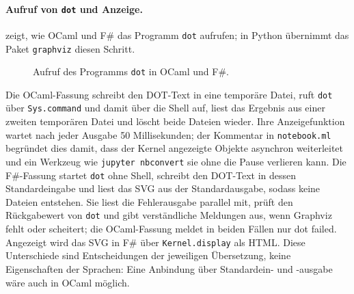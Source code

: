 \paragraph{Aufruf von \texttt{dot} und Anzeige.}
 zeigt, wie OCaml und F\# das Programm \texttt{dot} aufrufen; in Python übernimmt das Paket \texttt{graphviz} diesen Schritt.

\begin{figure}[htbp]


\caption{Aufruf des Programms \texttt{dot} in OCaml und F\#.}
\label{fig:render_dot}
\end{figure}

Die OCaml-Fassung schreibt den DOT-Text in eine temporäre Datei, ruft \texttt{dot} über \texttt{Sys.command} und damit über die Shell auf, liest das Ergebnis aus einer zweiten temporären Datei und löscht beide Dateien wieder.
Ihre Anzeigefunktion wartet nach jeder Ausgabe 50 Millisekunden; der Kommentar in \texttt{notebook.ml} begründet dies damit, dass der Kernel angezeigte Objekte asynchron weiterleitet und ein Werkzeug wie \texttt{jupyter nbconvert} sie ohne die Pause verlieren kann.
Die F\#-Fassung startet \texttt{dot} ohne Shell, schreibt den DOT-Text in dessen Standardeingabe und liest das SVG aus der Standardausgabe, sodass keine Dateien entstehen.
Sie liest die Fehlerausgabe parallel mit, prüft den Rückgabewert von \texttt{dot} und gibt verständliche Meldungen aus, wenn Graphviz fehlt oder scheitert; die OCaml-Fassung meldet in beiden Fällen nur \glqq dot failed\grqq.
Angezeigt wird das SVG in F\# über \texttt{Kernel.display} als HTML.
Diese Unterschiede sind Entscheidungen der jeweiligen Übersetzung, keine Eigenschaften der Sprachen: Eine Anbindung über Standardein- und -ausgabe wäre auch in OCaml möglich.

